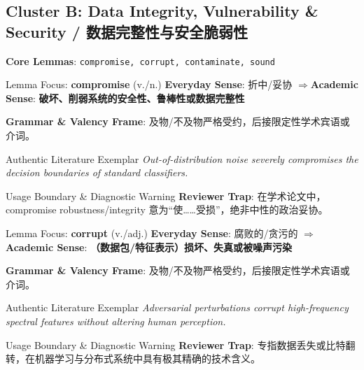 \subsection{Cluster B: Data Integrity, Vulnerability \& Security / 数据完整性与安全脆弱性}
\noindent\textbf{\color{AcadSlate}Core Lemmas}: \texttt{compromise, corrupt, contaminate, sound}\par\vspace{4pt}
\begin{ConceptBox}{Lemma Focus: \textbf{compromise} (v./n.)}
\textbf{Everyday Sense}: 折中/妥协 \quad$\Longrightarrow$\quad \textbf{Academic Sense}: \textbf{破坏、削弱系统的安全性、鲁棒性或数据完整性}\par\vspace{3pt}
\textbf{Grammar \& Valency Frame}: 及物/不及物严格受约，后接限定性学术宾语或介词。\par
\end{ConceptBox}
\begin{ExampleBox}{Authentic Literature Exemplar}
\textit{Out-of-distribution noise severely compromises the decision boundaries of standard classifiers.}
\end{ExampleBox}
\begin{TipBox}{Usage Boundary \& Diagnostic Warning}
\textbf{Reviewer Trap}: 在学术论文中，compromise robustness/integrity 意为“使……受损”，绝非中性的政治妥协。
\end{TipBox}
\vspace{6pt}
\begin{ConceptBox}{Lemma Focus: \textbf{corrupt} (v./adj.)}
\textbf{Everyday Sense}: 腐败的/贪污的 \quad$\Longrightarrow$\quad \textbf{Academic Sense}: \textbf{（数据包/特征表示）损坏、失真或被噪声污染}\par\vspace{3pt}
\textbf{Grammar \& Valency Frame}: 及物/不及物严格受约，后接限定性学术宾语或介词。\par
\end{ConceptBox}
\begin{ExampleBox}{Authentic Literature Exemplar}
\textit{Adversarial perturbations corrupt high-frequency spectral features without altering human perception.}
\end{ExampleBox}
\begin{TipBox}{Usage Boundary \& Diagnostic Warning}
\textbf{Reviewer Trap}: 专指数据丢失或比特翻转，在机器学习与分布式系统中具有极其精确的技术含义。
\end{TipBox}
\vspace{6pt}
